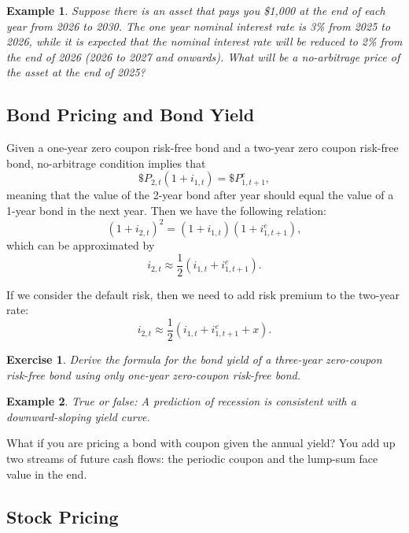\documentclass[12pt]{article}
\newtheorem{example}{Example}
\newtheorem{exercise}{Exercise}
\begin{document}
\begin{example}
    Suppose there is an asset that pays you \$1,000 at the end of each year from 2026 to 2030. The one year nominal interest rate is 3\% from 2025 to 2026, while it is expected that the nominal interest rate will be reduced to 2\% from the end of 2026 (2026 to 2027 and onwards). What will be a no-arbitrage price of the asset at the end of 2025?
\end{example}

\subsection*{Bond Pricing and Bond Yield}
Given a one-year zero coupon risk-free bond and a two-year zero coupon risk-free bond, no-arbitrage condition implies that
\[\$P_{2,t} (1 + i_{1,t}) = \$P_{1, t+1}^e,\]
meaning that the value of the 2-year bond after year should equal the value of a 1-year bond in the next year. Then we have the following relation:
\[(1 + i_{2,t})^2 = (1 + i_{1,t})(1 + i_{1, t+1}^e),\]
which can be approximated by
\[ i_{2,t} \approx \frac{1}{2}(i_{1,t} + i_{1, t+1}^e).\]

If we consider the default risk, then we need to add risk premium to the two-year rate:
\[ i_{2,t} \approx \frac{1}{2}(i_{1,t} + i_{1, t+1}^e + x).\]

\begin{exercise}
    Derive the formula for the bond yield of a three-year zero-coupon risk-free bond using only one-year zero-coupon risk-free bond.
\end{exercise}

\begin{example}
    True or false: A prediction of recession is consistent with a downward-sloping yield curve.
\end{example}

What if you are pricing a bond with coupon given the annual yield? You add up two streams of future cash flows: the periodic coupon and the lump-sum face value in the end.

\subsection*{Stock Pricing}
\end{document}
